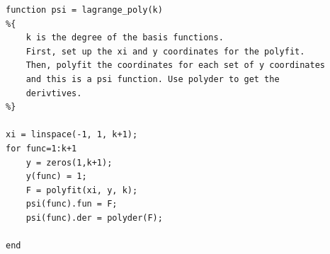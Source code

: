 \documentclass[10pt]{article}
\begin{document}
\begin{lstlisting}
function psi = lagrange_poly(k)
%{
    k is the degree of the basis functions.
    First, set up the xi and y coordinates for the polyfit.
    Then, polyfit the coordinates for each set of y coordinates
    and this is a psi function. Use polyder to get the 
    derivtives.
%}

xi = linspace(-1, 1, k+1); 
for func=1:k+1
    y = zeros(1,k+1);
    y(func) = 1;
    F = polyfit(xi, y, k);
    psi(func).fun = F;
    psi(func).der = polyder(F);

end
\end{lstlisting}
\end{document}
